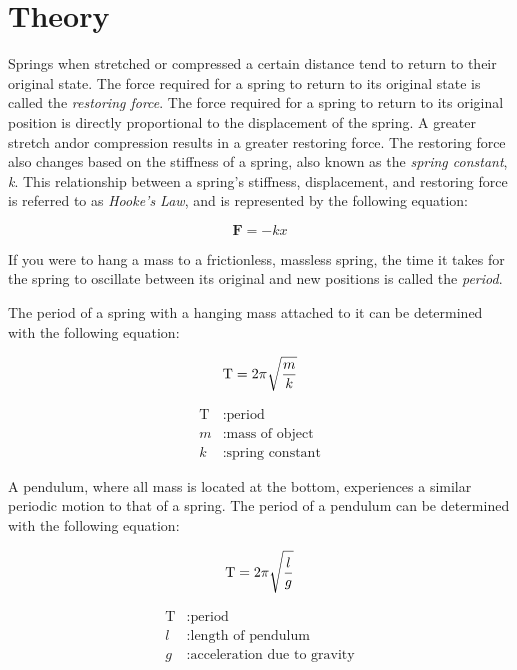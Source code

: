 \section{Theory}
\vspace{-0.5cm}
\singlespacing

Springs when stretched or compressed a certain distance tend to return to their original state. The force required for a spring to return to its original state is called the \textit{restoring force}. The force required for a spring to return to its original position is directly proportional to the displacement of the spring. A greater stretch and\/or compression results in a greater restoring force. The restoring force also changes based on the stiffness of a spring, also known as the \textit{spring constant}, \textit{k}. This relationship between a spring's stiffness, displacement, and restoring force is referred to as \textit{Hooke's Law}, and is represented by the following equation:

\begin{equation}
	\mathbf{F} = -kx
	\label{eq:hookesLaw}
\end{equation}

If you were to hang a mass to a frictionless, massless spring, the time it takes for the spring to oscillate between its original and new positions is called the \textit{period}.

The period of a spring with a hanging mass attached to it can be determined with the following equation:


\begin{equation*}
	\text{T} = 2\pi\sqrt{\frac{m}{k}} \\ 
\end{equation*}

\vspace{-0.5cm}

\begin{align*}
	\text{T} &: \text{period} \\
	m &: \text{mass of object} \\
	k &: \text{spring constant}
\end{align*}

A pendulum, where all mass is located at the bottom, experiences a similar periodic motion to that of a spring. The period of a pendulum can be determined with the following equation:

\begin{equation*}
	\text{T} = 2\pi\sqrt{\frac{l}{g}} \\ 
\end{equation*}

\vspace{-0.5cm}

\begin{align*}
	\text{T} &: \text{period} \\
	l &: \text{length of pendulum} \\
	g &: \text{acceleration due to gravity}
\end{align*}

\newpage
